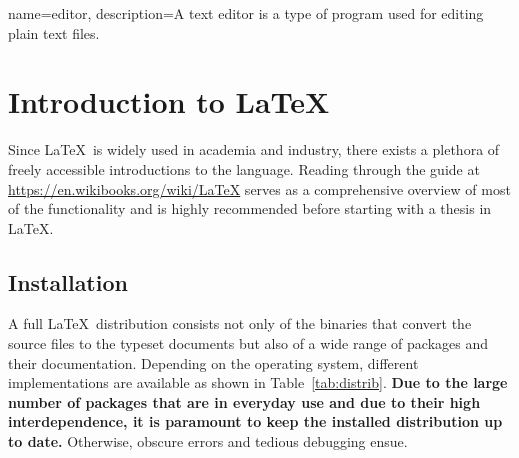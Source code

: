 %
%
%
%



{
  name={editor},
  description={A text editor is a type of program used for editing plain text files.}
}

\chapter{Introduction to \LaTeX}

Since \LaTeX\ is widely used in academia and industry, there exists a plethora of freely accessible introductions to the language.
Reading through the guide at \url{https://en.wikibooks.org/wiki/LaTeX} serves as a comprehensive overview of most of the functionality and is highly recommended before starting with a thesis in \LaTeX.

\section{Installation}

A full \LaTeX\ distribution consists not only of the binaries that convert the source files to the typeset documents but also of a wide range of packages and their documentation.
Depending on the operating system, different implementations are available as shown in Table~\ref{tab:distrib}.
\textbf{Due to the large number of packages that are in everyday use and due to their high interdependence, it is paramount to keep the installed distribution up to date.}
Otherwise, obscure errors and tedious debugging ensue.

